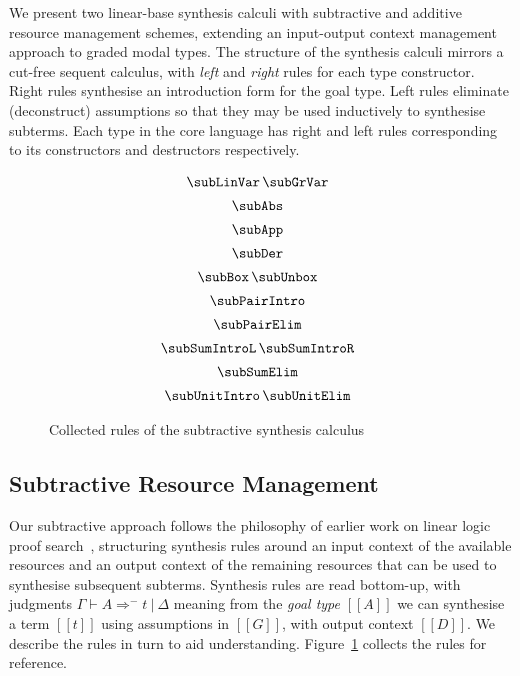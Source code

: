 We present two linear-base synthesis calculi with subtractive and additive resource
management schemes, extending an input-output context management approach to graded
modal types. The structure of the synthesis calculi mirrors a
cut-free sequent calculus, with
\textit{left} and \textit{right} rules for each type constructor. Right rules
synthesise an introduction form for the goal type. Left rules
eliminate (deconstruct) assumptions so that they may be
used inductively to synthesise subterms. Each type in the
core language has right and left
rules corresponding to its constructors and destructors respectively.


\begin{figure}[H]
\begin{align*}
\hspace{-0.5em}
  \begin{array}{c}
    \subLinVar
    \,
    \subGrVar
    \\[0.5em]
    \subAbs
    \\[0.5em]
    \subApp
    \\[0.5em]
    \subDer
    \\[0.5em]
    \subBox
    \,
    \subUnbox
    \\[0.5em]
    \subPairIntro
    \\[0.5em]
    \subPairElim
    \\[0.5em]
    \subSumIntroL
    \,
    \subSumIntroR
    \\[0.5em]
    \subSumElim
    \\[0.5em]
    \subUnitIntro
    \,
    \subUnitElim
  \end{array}
\end{align*}
\caption{Collected rules of the subtractive synthesis calculus}
\label{fig:sub-rules}
  \end{figure}



\subsection{Subtractive Resource Management}
  Our subtractive approach follows the philosophy of earlier work on
  linear logic proof search~\cite{HODAS1994327,CERVESATO2000133},
  structuring synthesis rules around an input context of the available
  resources and an output context of the remaining resources that
  can be used to synthesise subsequent subterms. Synthesis rules
  are read bottom-up, with judgments $\Gamma \vdash A \Rightarrow^{-} t\ |\ \Delta$
  meaning from the \emph{goal type} $[[A]]$ we can synthesise a term $[[t]]$ using
  assumptions in $[[G]]$, with output context $[[D]]$. We describe
  the rules in turn to aid understanding. Figure~\ref{fig:sub-rules} collects the
  rules for reference.


